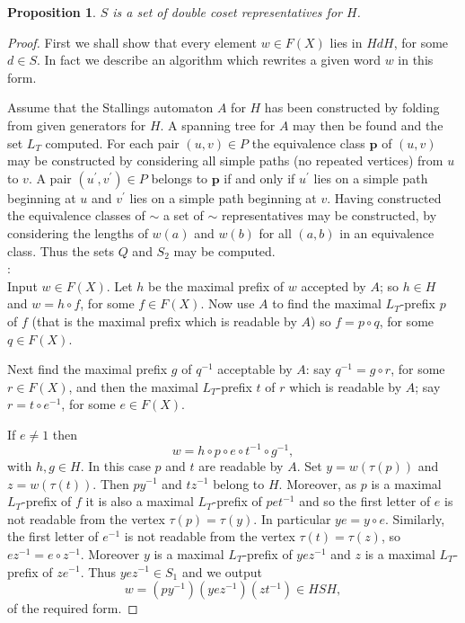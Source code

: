 \documentclass[a4paper,12pt]{article}
\def\t{\tau }
\newcommand{\pp}{\mathbf{p}}
\newtheorem{proposition}[theorem]{Proposition}
\numberwithin{equation}{section}
\numberwithin{figure}{section}
\begin{document}
\begin{proposition}\label{prop:dcreps}
$S$ is a set of double coset representatives for $H$.
\end{proposition}   
\begin{proof}
First we shall show that every element $w\in F(X)$ lies in $HdH$, for some $d\in S$. 
In fact we describe an algorithm which rewrites a given word $w$ in this form. 

Assume that the Stallings automaton $A$ for $H$ has been constructed by folding from
given generators for $H$. A spanning tree for $A$ may then be found and the 
set $L_T$ computed. For each pair $(u,v)\in P$ the equivalence class $\pp$ of 
$(u,v)$ may be constructed by considering all simple paths (no repeated vertices)
from $u$ to $v$. A pair $(u^\prime ,v^\prime) \in P$ belongs to $\pp$ if and only
if $u^\prime$ lies on a simple path beginning at $u$ and $v^\prime$ lies on 
a simple path beginning at $v$. Having constructed the equivalence classes of $\sim$
 a set of $\sim$ representatives may be constructed, by considering the 
lengths of $w(a)$ and $w(b)$ for all $(a,b)$ in an equivalence class. Thus the
sets $Q$ and $S_2$ may be computed.   \\

:\\
Input $w\in F(X)$. 
Let $h$ be the maximal prefix of $w$ accepted by $A$; so $h\in H$ and 
$w=h\circ f$, for some $f\in F(X)$. Now use $A$ to find the maximal $L_T$-prefix $p$ 
of $f$ (that is the maximal prefix which is readable by $A$)
 so $f= p\circ q$, for some $q\in F(X)$. 

Next find the maximal prefix $g$ of $q^{-1}$ acceptable by $A$: say 
$q^{-1}=g\circ r$, for some $r\in F(X)$, and then the maximal $L_T$-prefix 
$t$ of $r$ which
is readable by $A$; say $r=t\circ e^{-1}$, for some $e\in F(X)$. 

If $e\neq 1$ then
\[w=h\circ p \circ e\circ t^{-1}\circ g^{-1},\]
with $h,g\in H$. In this case $p$ and $t$ are readable by $A$. Set $y=w(\t(p))$
and $z=w(\t(t))$. Then $py^{-1}$ and $tz^{-1}$ belong to $H$. Moreover, as $p$
is a maximal $L_T$-prefix of $f$ it is also a maximal $L_T$-prefix of $pet^{-1}$ and so
  the 
first letter of $e$ is not readable from the vertex $\t(p)=\t(y)$. In particular
$ye=y\circ e$. Similarly, the first letter of $e^{-1}$ is not readable from
the vertex $\t(t)=\t(z)$, so $ez^{-1}=e\circ z^{-1}$. Moreover $y$ is a 
maximal $L_T$-prefix of $yez^{-1}$ and $z$ is a maximal $L_T$-prefix of $ze^{-1}$. 
Thus $yez^{-1}\in S_1$ and we output
\[w=(py^{-1}) (yez^{-1})(zt^{-1})\in HSH,\]
of the required form.


\end{proof}
\end{document}
